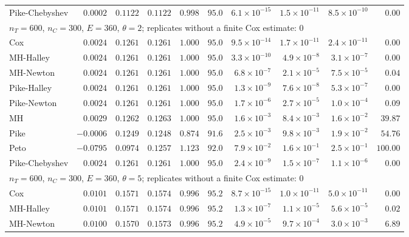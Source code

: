 \begin{landscape}
\begin{longtable}{lrrrrrrrrr}
Pike-Chebyshev & $0.0002$ & $0.1122$ & $0.1122$ & $0.998$ & $95.0$ & $6.1 \times 10^{-15}$ & $1.5 \times 10^{-11}$ & $8.5 \times 10^{-10}$ & $0.00$ \\
\multicolumn{10}{l}{$n_T = 600$, $n_C = 300$, $E = 360$, $\theta = 2$; replicates without a finite Cox estimate: 0} \\
Cox & $0.0024$ & $0.1261$ & $0.1261$ & $1.000$ & $95.0$ & $9.5 \times 10^{-14}$ & $1.7 \times 10^{-11}$ & $2.4 \times 10^{-11}$ & $0.00$ \\
MH-Halley & $0.0024$ & $0.1261$ & $0.1261$ & $1.000$ & $95.0$ & $3.3 \times 10^{-10}$ & $4.9 \times 10^{-8}$ & $3.1 \times 10^{-7}$ & $0.00$ \\
MH-Newton & $0.0024$ & $0.1261$ & $0.1261$ & $1.000$ & $95.0$ & $6.8 \times 10^{-7}$ & $2.1 \times 10^{-5}$ & $7.5 \times 10^{-5}$ & $0.04$ \\
Pike-Halley & $0.0024$ & $0.1261$ & $0.1261$ & $1.000$ & $95.0$ & $1.3 \times 10^{-9}$ & $7.6 \times 10^{-8}$ & $5.3 \times 10^{-7}$ & $0.00$ \\
Pike-Newton & $0.0024$ & $0.1261$ & $0.1261$ & $1.000$ & $95.0$ & $1.7 \times 10^{-6}$ & $2.7 \times 10^{-5}$ & $1.0 \times 10^{-4}$ & $0.09$ \\
MH & $0.0029$ & $0.1262$ & $0.1263$ & $1.000$ & $95.0$ & $1.6 \times 10^{-3}$ & $8.4 \times 10^{-3}$ & $1.6 \times 10^{-2}$ & $39.87$ \\
Pike & $-0.0006$ & $0.1249$ & $0.1248$ & $0.874$ & $91.6$ & $2.5 \times 10^{-3}$ & $9.8 \times 10^{-3}$ & $1.9 \times 10^{-2}$ & $54.76$ \\
Peto & $-0.0795$ & $0.0974$ & $0.1257$ & $1.123$ & $92.0$ & $7.9 \times 10^{-2}$ & $1.6 \times 10^{-1}$ & $2.5 \times 10^{-1}$ & $100.00$ \\
Pike-Chebyshev & $0.0024$ & $0.1261$ & $0.1261$ & $1.000$ & $95.0$ & $2.4 \times 10^{-9}$ & $1.5 \times 10^{-7}$ & $1.1 \times 10^{-6}$ & $0.00$ \\
\multicolumn{10}{l}{$n_T = 600$, $n_C = 300$, $E = 360$, $\theta = 5$; replicates without a finite Cox estimate: 0} \\
Cox & $0.0101$ & $0.1571$ & $0.1574$ & $0.996$ & $95.2$ & $8.7 \times 10^{-15}$ & $1.0 \times 10^{-11}$ & $5.0 \times 10^{-11}$ & $0.00$ \\
MH-Halley & $0.0101$ & $0.1571$ & $0.1574$ & $0.996$ & $95.2$ & $1.3 \times 10^{-7}$ & $1.1 \times 10^{-5}$ & $5.6 \times 10^{-5}$ & $0.02$ \\
MH-Newton & $0.0100$ & $0.1570$ & $0.1573$ & $0.996$ & $95.2$ & $4.9 \times 10^{-5}$ & $9.7 \times 10^{-4}$ & $3.0 \times 10^{-3}$ & $6.89$ \\

\end{longtable}
\end{landscape}
